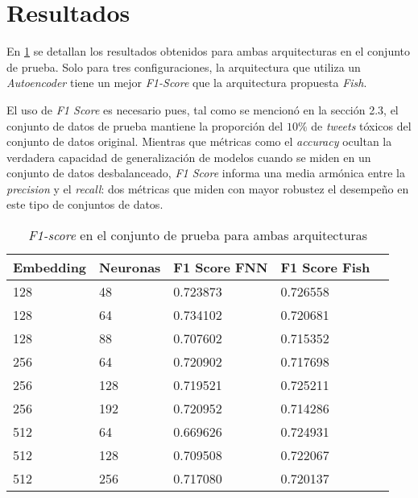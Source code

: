 \section{Resultados}


En \ref{fig:resultados-fish} se detallan los resultados obtenidos para ambas arquitecturas en el conjunto de prueba. Solo para tres configuraciones, la arquitectura que utiliza un \textit{Autoencoder} tiene un mejor \textit{F1-Score} que la arquitectura propuesta \textit{Fish}.

El uso de \textit{F1 Score} es necesario pues, tal como se mencionó en la sección 2.3, el conjunto de datos de prueba mantiene la proporción del $10\%$ de \textit{tweets} tóxicos del conjunto de datos original. Mientras que métricas como el \textit{accuracy} ocultan la verdadera capacidad de generalización de modelos cuando se miden en un conjunto de datos desbalanceado, \textit{F1 Score} informa una media armónica entre la \textit{precision} y el \textit{recall}: dos métricas que miden con mayor robustez el desempeño en este tipo de conjuntos de datos.

\begin{table}[ht]
\begin{tabularx}{.45\textwidth}{||l|X|X|X|X||}
\hline
Embedding & Neuronas & F1 Score FNN & F1 Score Fish                  \\ \hline\hline
128       &    48    & 0.723873     & 0.726558 \cellcolor{green!20}  \\ \hline
128       &    64    & 0.734102     & 0.720681 \cellcolor{red!30}    \\ \hline
128       &    88    & 0.707602     & 0.715352 \cellcolor{green!20}  \\ \hline               
256       &    64    & 0.720902     & 0.717698 \cellcolor{red!30}    \\ \hline
256       &    128   & 0.719521     & 0.725211 \cellcolor{green!20}  \\ \hline
256       &    192   & 0.720952     & 0.714286 \cellcolor{red!30}    \\ \hline
512       &    64    & 0.669626     & 0.724931 \cellcolor{green!20}  \\ \hline
512       &    128   & 0.709508     & 0.722067 \cellcolor{green!20}  \\ \hline
512       &    256   & 0.717080     & 0.720137 \cellcolor{green!20}  \\ \hline
\end{tabularx}
\caption{\label{fig:resultados-fish} \textit{F1-score} en el conjunto de prueba para ambas arquitecturas}
\end{table}